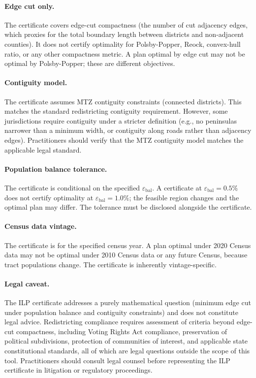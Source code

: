 \paragraph{Edge cut only.}
The certificate covers edge-cut compactness (the number of cut adjacency
edges, which proxies for the total boundary length between districts and
non-adjacent counties).
It does not certify optimality for Polsby-Popper, Reock, convex-hull ratio,
or any other compactness metric.
A plan optimal by edge cut may not be optimal by Polsby-Popper; these are
different objectives.

\paragraph{Contiguity model.}
The certificate assumes MTZ contiguity constraints (connected districts).
This matches the standard redistricting contiguity requirement.
However, some jurisdictions require contiguity under a stricter definition
(e.g., no peninsulas narrower than a minimum width, or contiguity along
roads rather than adjacency edges).
Practitioners should verify that the MTZ contiguity model matches the
applicable legal standard.

\paragraph{Population balance tolerance.}
The certificate is conditional on the specified $\varepsilon_{\mathrm{bal}}$.
A certificate at $\varepsilon_{\mathrm{bal}} = 0.5\%$ does not certify
optimality at $\varepsilon_{\mathrm{bal}} = 1.0\%$; the feasible region
changes and the optimal plan may differ.
The tolerance must be disclosed alongside the certificate.

\paragraph{Census data vintage.}
The certificate is for the specified census year.
A plan optimal under 2020 Census data may not be optimal under 2010 Census
data or any future Census, because tract populations change.
The certificate is inherently vintage-specific.

\paragraph{Legal caveat.}
The ILP certificate addresses a purely mathematical question (minimum
edge cut under population balance and contiguity constraints) and does not
constitute legal advice.
Redistricting compliance requires assessment of criteria beyond edge-cut
compactness, including Voting Rights Act compliance, preservation of
political subdivisions, protection of communities of interest, and
applicable state constitutional standards, all of which are legal questions
outside the scope of this tool.
Practitioners should consult legal counsel before representing the ILP
certificate in litigation or regulatory proceedings.

